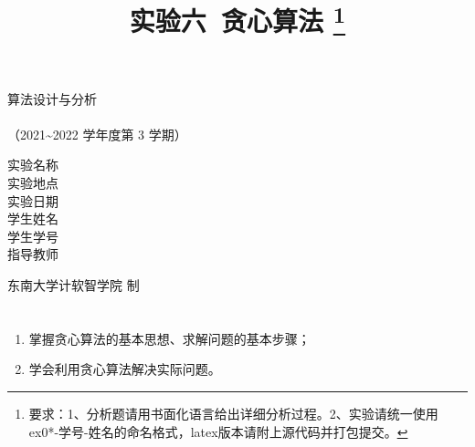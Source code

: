 \documentclass[12pt,a4paper]{ctexart}
\begin{document}
    \begin{titlepage}
        \heiti
        \vspace*{64pt}
        \begin{center}
            \fontsize{48pt}{0} 算法设计与分析\\
            \vspace*{36pt}
            \\
            \vspace*{48pt}
            \LARGE（2021\~{}2022 学年度\qquad 第 3 学期）\\
            \vspace*{48pt}
        
            \LARGE 实验名称\ \ \underline{\makebox[200pt]{\ExamTitle}}\\
            \LARGE 实验地点\ \ \underline{\makebox[200pt]{\ExamAddr}}\\
            \LARGE 实验日期\ \ \underline{\makebox[200pt]{\today}}\\
            \LARGE 学生姓名\ \ \underline{\makebox[200pt]{\MyName}}\\
            \LARGE 学生学号\ \ \underline{\makebox[200pt]{\MySID}}\\
            \LARGE 指导教师\ \ \underline{\makebox[200pt]{\TeacherName}}\\
            \vspace*{48pt}
            
            \LARGE 东南大学\quad  计软智学院 \quad 制
        \end{center}
    \end{titlepage}

\title{
  {\heiti \textbf{实验六\ 贪心算法}
    \footnote{要求：1、分析题请用书面化语言给出详细分析过程。2、实验请统一使用ex0*-学号-姓名的命名格式，latex版本请附上源代码并打包提交。}
    }
}
\date{}

\maketitle

\section*{\bf \color{black}{一、实验目的及意义}}
\noindent
\begin{enumerate}
	\item[(1)]  掌握贪心算法的基本思想、求解问题的基本步骤；
	\item[(2)]  学会利用贪心算法解决实际问题。
\end{enumerate}
\end{document}
